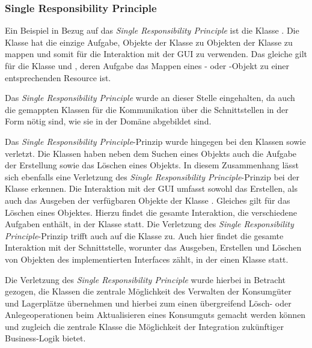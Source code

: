 \subsubsection*{Single Responsibility Principle}
Ein Beispiel in Bezug auf das \textit{Single Responsibility Principle} ist die Klasse .
Die Klasse hat die einzige Aufgabe, Objekte der Klasse \href{}{} zu Objekten der Klasse \href{}{} zu mappen und somit für die Interaktion mit der \ac{GUI} zu verwenden.
Das gleiche gilt für die Klasse \href{}{} und \href{}{}, deren Aufgabe das Mappen eines \href{}{}- oder \href{}{}-Objekt zu einer entsprechenden Resource ist.

Das \textit{Single Responsibility Principle} wurde an dieser Stelle eingehalten, da auch die gemappten Klassen für die Kommunikation über die Schnittstellen in der Form nötig sind, wie sie in der Domäne abgebildet sind.

Das \textit{Single Responsibility Principle}-Prinzip wurde hingegen bei den Klassen \href{}{} sowie \href{}{} verletzt. Die Klassen haben neben dem Suchen eines Objekts auch die Aufgabe der Erstellung sowie das Löschen eines Objekts.
In diesem Zusammenhang lässt sich ebenfalls eine Verletzung des \textit{Single Responsibility Principle}-Prinzip bei der Klasse \href{}{} erkennen.
Die Interaktion mit der \ac{GUI} umfasst sowohl das Erstellen, als auch das Ausgeben der verfügbaren Objekte der Klasse \href{}{}.
Gleiches gilt für das Löschen eines Objektes.
Hierzu findet die gesamte Interaktion, die verschiedene Aufgaben enthält, in der Klasse \href{}{} statt.
Die Verletzung des \textit{Single Responsibility Principle}-Prinzip trifft auch auf die Klasse \href{}{} zu.
Auch hier findet die gesamte Interaktion mit der Schnittstelle, worunter das Ausgeben, Erstellen und Löschen von Objekten des implementierten Interfaces \href{}{} zählt, in der einen Klasse statt.

Die Verletzung des \textit{Single Responsibility Principle} wurde hierbei in Betracht gezogen, die Klassen die zentrale Möglichkeit des Verwalten der Konsumgüter und Lagerplätze übernehmen und hierbei zum einen übergreifend Lösch- oder Anlegeoperationen beim Aktualisieren eines Konsumguts gemacht werden können und zugleich die zentrale Klasse die Möglichkeit der Integration zukünftiger Business-Logik bietet.

